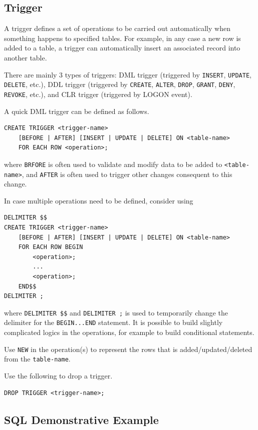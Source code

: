 \subsection{Trigger}

A trigger defines a set of operations to be carried out automatically when something happens to specified tables. For example, in any case a new row is added to a table, a trigger can automatically insert an associated record into another table.

There are mainly 3 types of triggers: DML trigger (triggered by \verb|INSERT|, \verb|UPDATE|, \verb|DELETE|, etc.), DDL trigger (triggered by \verb|CREATE|, \verb|ALTER|, \verb|DROP|, \verb|GRANT|, \verb|DENY|, \verb|REVOKE|, etc.), and CLR trigger (triggered by LOGON event).

A quick DML trigger can be defined as follows.
\begin{lstlisting}
CREATE TRIGGER <trigger-name>
    [BEFORE | AFTER] [INSERT | UPDATE | DELETE] ON <table-name>
    FOR EACH ROW <operation>;
\end{lstlisting}
where \verb|BRFORE| is often used to validate and modify data to be added to \verb|<table-name>|, and \verb|AFTER| is often used to trigger other changes consequent to this change.

In case multiple operations need to be defined, consider using
\begin{lstlisting}
DELIMITER $$
CREATE TRIGGER <trigger-name>
    [BEFORE | AFTER] [INSERT | UPDATE | DELETE] ON <table-name>
    FOR EACH ROW BEGIN
        <operation>;
        ...
        <operation>;
    END$$
DELIMITER ;
\end{lstlisting}
where \verb|DELIMITER $$| and \verb|DELIMITER ;| is used to temporarily change the delimiter for the \verb|BEGIN...END| statement. It is possible to build slightly complicated logics in the operations, for example to build conditional statements.

Use \verb|NEW| in the operation(s) to represent the rows that is added/updated/deleted from the \verb|table-name|.

Use the following to drop a trigger.
\begin{lstlisting}
DROP TRIGGER <trigger-name>;
\end{lstlisting}

\subsection{SQL Demonstrative Example}

